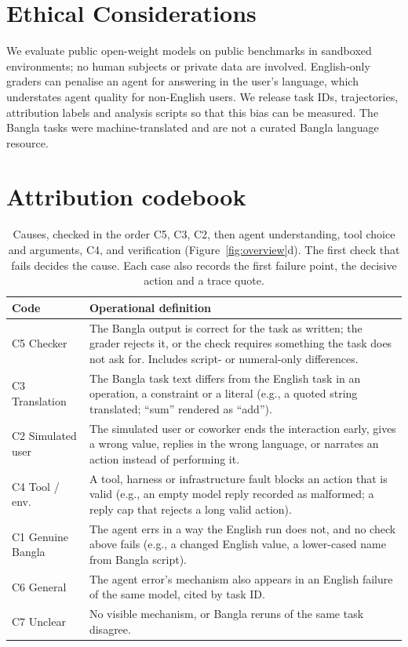 \documentclass[11pt]{article}
\begin{document}
\section*{Ethical Considerations}
We evaluate public open-weight models on public benchmarks in sandboxed environments; no human
subjects or private data are involved. English-only graders can penalise an agent for answering in
the user's language, which understates agent quality for non-English users. We release task IDs,
trajectories, attribution labels and analysis scripts so that this bias can be measured. The
Bangla tasks were machine-translated and are not a curated Bangla language resource.



\appendix

\section{Attribution codebook}
\label{app:codebook}

\begin{table}[h]
\centering\footnotesize
\begin{tabular}{L{1.5cm}L{5.25cm}}
\toprule
Code & Operational definition \\
\midrule
C5 Checker & The Bangla output is correct for the task as written; the grader rejects it, or the check
requires something the task does not ask for. Includes script- or numeral-only differences. \\
C3 Translation & The Bangla task text differs from the English task in an operation, a constraint or a
literal (e.g., a quoted string translated; ``sum'' rendered as ``add''). \\
C2 Simulated user & The simulated user or coworker ends the interaction early, gives a wrong value,
replies in the wrong language, or narrates an action instead of performing it. \\
C4 Tool / env. & A tool, harness or infrastructure fault blocks an action that is valid (e.g., an
empty model reply recorded as malformed; a reply cap that rejects a long valid action). \\
C1 Genuine Bangla & The agent errs in a way the English run does not, and no check above fails
(e.g., a changed English value, a lower-cased name from Bangla script). \\
C6 General & The agent error's mechanism also appears in an English failure of the same model, cited
by task ID. \\
C7 Unclear & No visible mechanism, or Bangla reruns of the same task disagree. \\
\bottomrule
\end{tabular}
\caption{Causes, checked in the order C5, C3, C2, then agent understanding, tool choice and
arguments, C4, and verification (Figure~\ref{fig:overview}d). The first check that fails decides
the cause. Each case also records the first failure point, the decisive action and a trace quote.}
\label{tab:codebook}
\end{table}
\end{document}
